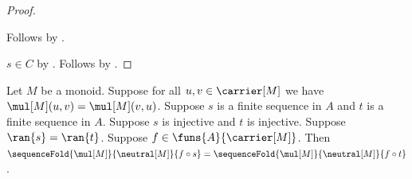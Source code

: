 \begin{proof}
\begin{subproof}
\begin{subproof}
        \end{subproof}
        Follows by \auto.
    \end{subproof}
    $s\in C$ by .
    Follows by \auto.
\end{proof}

\begin{theorem}\label{spike_injective_sequence_fold_invariant}
    Let $M$ be a monoid.
    Suppose for all $u,v\in\carrier[M]$ we have
        $\mul[M](u,v)=\mul[M](v,u)$.
    Suppose $s$ is a finite sequence in $A$ and
        $t$ is a finite sequence in $A$.
    Suppose $s$ is injective and $t$ is injective.
    Suppose $=$.
    Suppose $f\in{}$.
    Then
        $
            =$.
\end{theorem}
